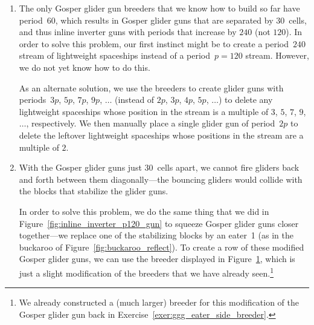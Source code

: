 \begin{enumerate}
	\item[1)] The only Gosper glider gun breeders that we know how to build so far have period~$60$, which results in Gosper glider guns that are separated by $30$~cells, and thus inline inverter guns with periods that increase by $240$ (not $120$). In order to solve this problem, our first instinct might be to create a period~$240$ stream of lightweight spaceships instead of a period~$p = 120$ stream. However, we do not yet know how to do this.
	
	As an alternate solution, we use the breeders to create glider guns with periods~$3p$, $5p$, $7p$, $9p$, $\ldots$ (instead of $2p$, $3p$, $4p$, $5p$, $\ldots$) to delete any lightweight spaceships whose position in the stream is a multiple of $3$, $5$, $7$, $9$, $\ldots$, respectively. We then manually place a single glider gun of period~$2p$ to delete the leftover lightweight spaceships whose positions in the stream are a multiple of $2$.\smallskip
	
	\item[2)] With the Gosper glider guns just $30$~cells apart, we cannot fire gliders back and forth between them diagonally---the bouncing gliders would collide with the blocks that stabilize the glider guns.
	
	In order to solve this problem, we do the same thing that we did in Figure~\ref{fig:inline_inverter_p120_gun} to squeeze Gosper glider guns closer together---we replace one of the stabilizing blocks by an eater~1 (as in the buckaroo of Figure~\ref{fig:buckaroo_reflect}). To create a row of these modified Gosper glider guns, we can use the breeder displayed in Figure~\ref{fig:breeder_ggg_eater_1_stabilize}, which is just a slight modification of the breeders that we have already seen.\footnote{We already constructed a (much larger) breeder for this modification of the Gosper glider gun back in Exercise~\ref{exer:ggg_eater_side_breeder}.}\smallskip

	\begin{figure}[!htb]
		\centering
		\label{fig:breeder_ggg_eater_1_stabilize}
	\end{figure}
	

\end{enumerate}
